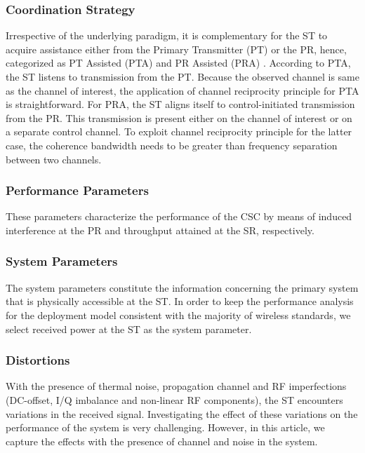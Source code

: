 \documentclass[draftcls, onecolumn, 11pt]{IEEEtran}
\begin{document}
\subsubsection*{Coordination Strategy} 
Irrespective of the underlying paradigm, it is complementary for the ST to acquire assistance either from the Primary Transmitter (PT) or the PR, hence, categorized as PT Assisted (PTA) and PR Assisted (PRA) \cite{Song14}. According to PTA, the ST listens to transmission from the PT. Because the observed channel is same as the channel of interest, the application of channel reciprocity principle for PTA is straightforward. For PRA, the ST aligns itself to control-initiated transmission from the PR. This transmission is present either on the channel of interest or on a separate control channel. To exploit channel reciprocity principle for the latter case, the coherence bandwidth needs to be greater than frequency separation between two channels. 

\subsubsection*{Performance Parameters}
These parameters characterize the performance of the CSC by means of induced interference at the PR and throughput attained at the SR, respectively. 

\subsubsection*{System Parameters}
The system parameters constitute the information concerning the primary system that is physically accessible at the ST.  
In order to keep the performance analysis for the deployment model consistent with the majority of wireless standards, we select received power at the ST as the system parameter. %


\subsubsection*{Distortions}
With the presence of thermal noise, propagation channel and RF imperfections (DC-offset, I/Q imbalance and non-linear RF components), the ST encounters variations in the received signal. Investigating the effect of these variations on the performance of the system is very challenging. However, in this article, we capture the effects with the presence of channel and noise in the system.   
\end{document}

